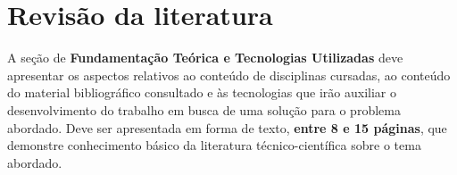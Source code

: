 \chapter{Revisão da literatura}
\label{sec-revlit}

A seção de \textbf{Fundamentação Teórica e Tecnologias Utilizadas} deve apresentar
os aspectos relativos ao conteúdo de disciplinas cursadas, ao conteúdo do material
bibliográfico consultado e às tecnologias que irão auxiliar o desenvolvimento do trabalho
em busca de uma solução para o problema abordado. Deve ser apresentada em forma de
texto, \textbf{entre 8 e 15 páginas}, que demonstre conhecimento básico da literatura técnico-científica sobre o tema abordado.